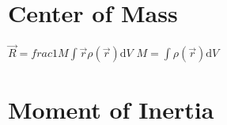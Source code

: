 \documentclass{cheatsheet}
\begin{document}
	\section*{Center of Mass}
		$\vec{R} = frac{1}{M}\int \vec r \rho(\vec r) \mathrm{d}V$
		$M = \int \rho(\vec r)\mathrm{d}V$

	\section*{Moment of Inertia}
		
\end{document}
